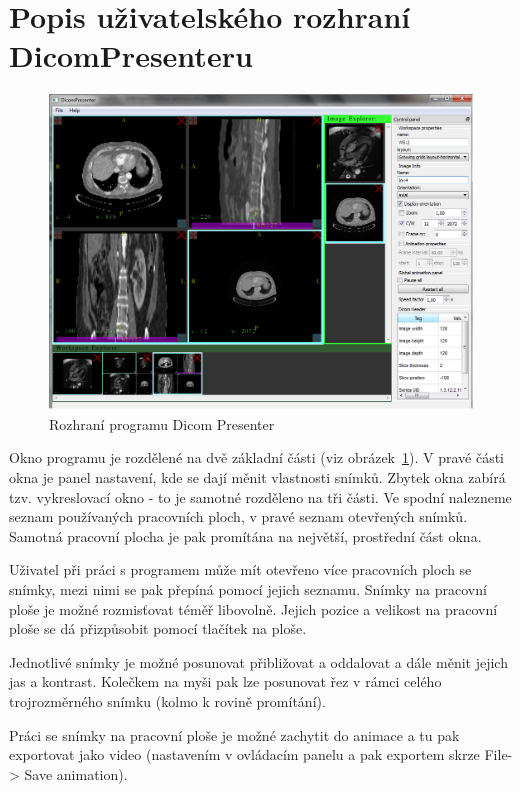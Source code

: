 \section*{Popis uživatelského rozhraní DicomPresenteru}
\begin{figure}
	\begin{center}
	\includegraphics[width=130mm]{Text/IMG/04_GUI_Screenshot.png}
	\end{center}
	\caption{Rozhraní programu Dicom Presenter}
	\label{screenshot}
\end{figure}
Okno programu je rozdělené na dvě základní části (viz obrázek~\ref{screenshot}). V pravé části okna je panel nastavení, kde se dají měnit vlastnosti snímků. Zbytek okna zabírá tzv. vykreslovací okno - to je samotné rozděleno na tři části. Ve spodní nalezneme seznam používaných pracovních ploch, v pravé seznam otevřených snímků. Samotná pracovní plocha je pak promítána na největší, prostřední část okna.

Uživatel při práci s programem může mít otevřeno více pracovních ploch se snímky, mezi nimi se pak přepíná pomocí jejich seznamu. Snímky na pracovní ploše je možné rozmisťovat téměř libovolně. Jejich pozice a velikost na pracovní ploše se dá přizpůsobit pomocí tlačítek na ploše.

Jednotlivé snímky je možné posunovat přibližovat a oddalovat a dále měnit jejich jas a kontrast. Kolečkem na myši pak lze posunovat řez v rámci celého trojrozměrného snímku (kolmo k rovině promítání).

Práci se snímky na pracovní ploše je možné zachytit do animace a tu pak exportovat jako video (nastavením v ovládacím panelu a pak exportem skrze File-> Save animation).

